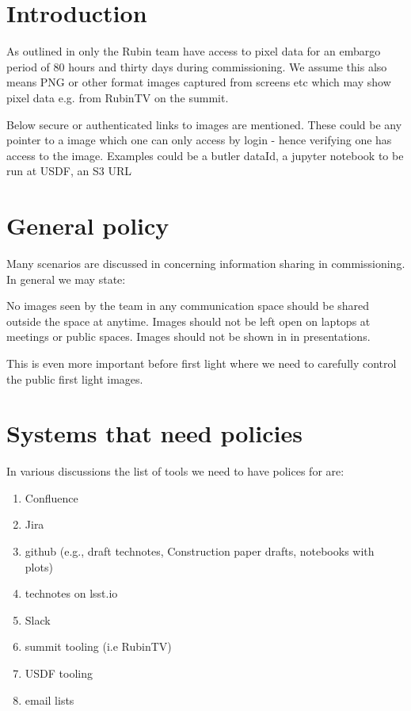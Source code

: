 
\section{Introduction}
As outlined in  only the Rubin team have access to pixel data for an embargo period of 80 hours and thirty days during commissioning. We assume this also means PNG or other format images captured from screens etc which may show pixel data e.g. from RubinTV on the summit.

Below secure or authenticated links to images are mentioned.
These could be any pointer to a image which one can only access by login - hence verifying one has access to the image. Examples could be a butler dataId, a jupyter notebook to be run at USDF, an S3 URL

\section{General policy} \label{sec:genpol}
Many scenarios are discussed in  concerning information sharing in commissioning.
In general we may state:

No images seen by the team in any communication space should be shared outside the space at anytime.
Images should not be left open on laptops at meetings or public spaces.
Images should not be shown in in presentations.


This is even more important before first light where we need to carefully control the public first light images.

\section {Systems that need policies}
In various discussions the list of tools we need to have polices for are:

\begin{enumerate}
    \item Confluence
    \item Jira
    \item github (e.g., draft technotes, Construction paper drafts, notebooks with plots)
    \item technotes on lsst.io
    \item Slack
    \item summit tooling (i.e RubinTV)
    \item USDF tooling
    \item email lists
\end{enumerate}

